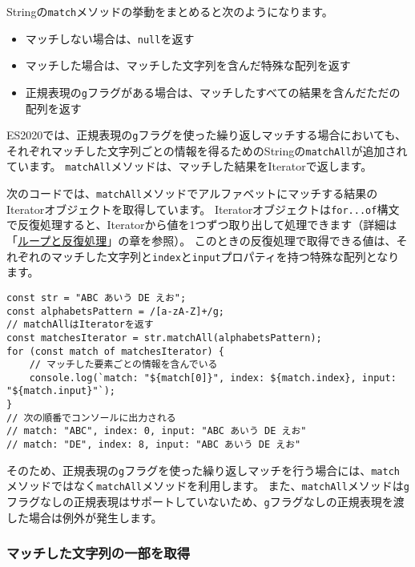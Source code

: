 Stringの\texttt{match}メソッドの挙動をまとめると次のようになります。

\begin{itemize}
\item 
  マッチしない場合は、\texttt{null}を返す
\item
  マッチした場合は、マッチした文字列を含んだ特殊な配列を返す
\item
  正規表現の\texttt{g}フラグがある場合は、マッチしたすべての結果を含んだただの配列を返す
\end{itemize}

ES2020では、正規表現の\texttt{g}フラグを使った繰り返しマッチする場合においても、それぞれマッチした文字列ごとの情報を得るためのStringの\texttt{matchAll}が追加されています。
\texttt{matchAll}メソッドは、マッチした結果をIteratorで返します。

次のコードでは、\texttt{matchAll}メソッドでアルファベットにマッチする結果のIteratorオブジェクトを取得しています。
Iteratorオブジェクトは\texttt{for...of}構文で反復処理すると、Iteratorから値を1つずつ取り出して処理できます（詳細は「\hyperlink{loop-and-iteration}{ループと反復処理}」の章を参照）。
このときの反復処理で取得できる値は、それぞれのマッチした文字列と\texttt{index}と\texttt{input}プロパティを持つ特殊な配列となります。

\begin{lstlisting}
const str = "ABC あいう DE えお";
const alphabetsPattern = /[a-zA-Z]+/g;
// matchAllはIteratorを返す
const matchesIterator = str.matchAll(alphabetsPattern);
for (const match of matchesIterator) {
    // マッチした要素ごとの情報を含んでいる
    console.log(`match: "${match[0]}", index: ${match.index}, input: "${match.input}"`);
}
// 次の順番でコンソールに出力される
// match: "ABC", index: 0, input: "ABC あいう DE えお"
// match: "DE", index: 8, input: "ABC あいう DE えお"
\end{lstlisting}

そのため、正規表現の\texttt{g}フラグを使った繰り返しマッチを行う場合には、\texttt{match}メソッドではなく\texttt{matchAll}メソッドを利用します。
また、\texttt{matchAll}メソッドは\texttt{g}フラグなしの正規表現はサポートしていないため、\texttt{g}フラグなしの正規表現を渡した場合は例外が発生します。

\hypertarget{match-capture-by-regexp}{%
\subsubsection{マッチした文字列の一部を取得}\label{match-capture-by-regexp}}

